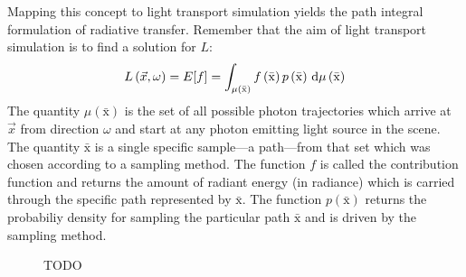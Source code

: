 Mapping this concept to light transport simulation yields the path integral formulation of radiative transfer. Remember that the aim of light transport simulation is to find a solution for $L$:
\begin{align}
L\left(\vec{x},\omega\right) = E[f] = \int_{\mu\left(\bar{\mathrm{x}}\right)} f\left(\bar{\mathrm{x}}\right)p\left(\bar{\mathrm{x}}\right)
\,\mathrm{d}\mu\left(\bar{\mathrm{x}}\right)
\end{align}
The quantity $\mu\left(\bar{\mathrm{x}}\right)$ is the set of all possible photon trajectories which arrive at $\vec{x}$ from direction $\omega$ and start at any photon emitting light source in the scene. The quantity $\bar{\mathrm{x}}$ is a single specific sample---a path---from that set which was chosen according to a sampling method. The function $f$ is called the contribution function and returns the amount of radiant energy (in radiance) which is carried through the specific path represented by $\bar{\mathrm{x}}$. The function $p(\bar{\mathrm{x}})$ returns the probabiliy density for sampling the particular path $\bar{\mathrm{x}}$ and is driven by the sampling method.
\begin{figure}[t]
\centering
{}
\caption{TODO}
\label{fig:mc_path_sample_contributions}
\end{figure}

